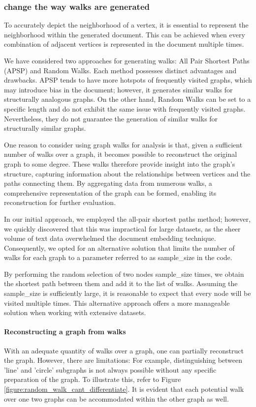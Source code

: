 \subsubsection{change the way walks are generated}
To accurately depict the neighborhood of a vertex, it is essential to represent the neighborhood within the generated document. This can be achieved when every combination of adjacent vertices is represented in the document multiple times.

We have considered two approaches for generating walks: All Pair Shortest Paths (APSP) and Random Walks. Each method possesses distinct advantages and drawbacks. APSP tends to have more hotspots of frequently visited graphs, which may introduce bias in the document; however, it generates similar walks for structurally analogous graphs. On the other hand, Random Walks can be set to a specific length and do not exhibit the same issue with frequently visited graphs. Nevertheless, they do not guarantee the generation of similar walks for structurally similar graphs.

One reason to consider using graph walks for analysis is that, given a sufficient number of walks over a graph, it becomes possible to reconstruct the original graph to some degree. These walks therefore provide insight into the graph's structure, capturing information about the relationships between vertices and the paths connecting them. By aggregating data from numerous walks, a comprehensive representation of the graph can be formed, enabling its reconstruction for further evaluation.

In our initial approach, we employed the all-pair shortest paths method; however, we quickly discovered that this was impractical for large datasets, as the sheer volume of text data overwhelmed the document embedding technique. Consequently, we opted for an alternative solution that limits the number of walks for each graph to a parameter referred to as sample\_size in the code.

By performing the random selection of two nodes sample\_size times, we obtain the shortest path between them and add it to the list of walks. Assuming the sample\_size is sufficiently large, it is reasonable to expect that every node will be visited multiple times. This alternative approach offers a more manageable solution when working with extensive datasets.

\paragraph{Reconstructing a graph from walks}
With an adequate quantity of walks over a graph, one can partially reconstruct the graph. However, there are limitations: For example, distinguishing between 'line' and 'circle' subgraphs is not always possible without any specific preparation of the graph. To illustrate this, refer to Figure \ref{figure:random_walk_cant_differentiate}. It is evident that each potential walk over one two graphs can be accommodated within the other graph as well.

